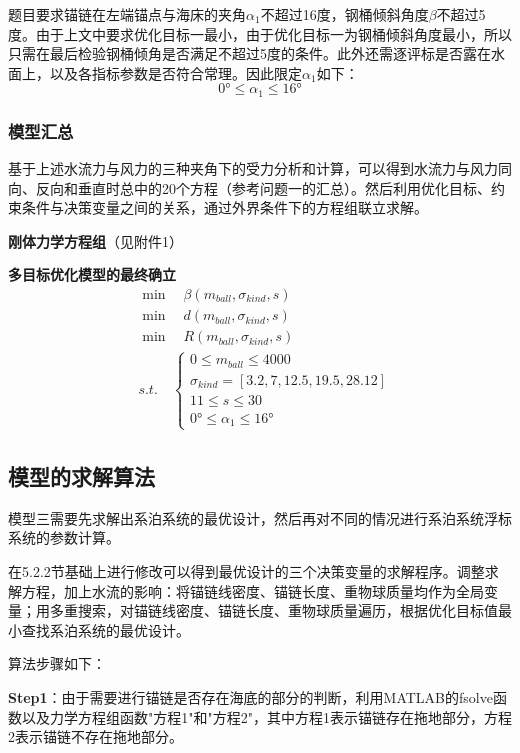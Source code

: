 \documentclass[withoutpreface,bwprint]{cumcmthesis}
\begin{document}
题目要求锚链在左端锚点与海床的夹角$\alpha_1$不超过16度，钢桶倾斜角度$\beta$不超过5度。由于上文中要求优化目标一最小，由于优化目标一为钢桶倾斜角度最小，所以只需在最后检验钢桶倾角是否满足不超过5度的条件。此外还需逐评标是否露在水面上，以及各指标参数是否符合常理。因此限定$\alpha_1$如下：
\begin{equation}
0° \leq \alpha_1 \leq 16°
\end{equation}

\subsubsection{模型汇总}
基于上述水流力与风力的三种夹角下的受力分析和计算，可以得到水流力与风力同向、反向和垂直时总中的20个方程（参考问题一的汇总）。然后利用优化目标、约束条件与决策变量之间的关系，通过外界条件下的方程组联立求解。

\textbf{刚体力学方程组}（见附件1）

\textbf{多目标优化模型的最终确立}
\begin{equation}
\begin{aligned}
&\min \quad \beta(m_{ball}, \sigma_{kind}, s) \\
&\min \quad d(m_{ball}, \sigma_{kind}, s) \\
&\min \quad R(m_{ball}, \sigma_{kind}, s) \\
&s.t. \quad \begin{cases}
0 \leq m_{ball} \leq 4000 \\
\sigma_{kind} = [3.2, 7, 12.5, 19.5, 28.12] \\
11 \leq s \leq 30 \\
0° \leq \alpha_1 \leq 16°
\end{cases}
\end{aligned}
\end{equation}

\subsection{模型的求解算法}
模型三需要先求解出系泊系统的最优设计，然后再对不同的情况进行系泊系统浮标系统的参数计算。

在5.2.2节基础上进行修改可以得到最优设计的三个决策变量的求解程序。调整求解方程，加上水流的影响：将锚链线密度、锚链长度、重物球质量均作为全局变量；用多重搜索，对锚链线密度、锚链长度、重物球质量遍历，根据优化目标值最小查找系泊系统的最优设计。

算法步骤如下：

\textbf{Step1}：由于需要进行锚链是否存在海底的部分的判断，利用MATLAB的fsolve函数以及力学方程组函数"方程1"和"方程2"，其中方程1表示锚链存在拖地部分，方程2表示锚链不存在拖地部分。
\end{document}
